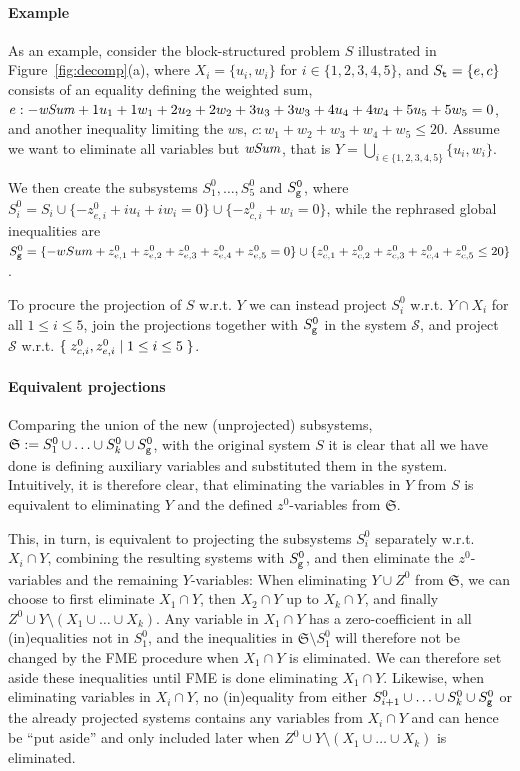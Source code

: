 \paragraph{Example}
As an example, consider the block-structured problem $S$ illustrated in Figure~\ref{fig:decomp}(a), where $X_i=\{u_i, w_i\}$ for $i\in\{1,2,3,4,5\}$, and $S_{\texttt{t}}=\{e,c\}$ consists of an equality defining the weighted sum, $e: - \mathit{wSum} + 1u_1+ 1w_1 + 2u_2+ 2w_2 + 3u_3+ 3w_3 + 4u_4+ 4w_4 + 5u_5+ 5w_5 = 0$, and another inequality limiting the $w$s, $c: w_1 + w_2 + w_3 + w_4 + w_5\leq 20$. Assume we want to eliminate all variables but $\mathit{wSum}$, that is $Y = \bigcup_{i\in\{1,2,3,4,5\}}\{u_i,w_i\}$.

We then create the subsystems $S^0_1, \ldots, S^0_5$ and $S^0_{\texttt{g}}$, where $S^0_i = S_i \cup 
\{-z^0_{e,i} + iu_i + iw_i = 0 \} \cup \{ -z^0_{c,i} + w_i = 0 \}$, while the rephrased global inequalities are $S_{\texttt{g}}^0 = \{-wSum + z^0_{e,1} + z^0_{e,2} + z^0_{e,3} + z^0_{e,4} + z^0_{e,5} = 0 \} \cup \{ z^0_{c,1} +z^0_{c,2} +z^0_{c,3}+z^0_{c,4}+z^0_{c,5} \leq 20\}$.   

To procure the projection of $S$ w.r.t. $Y$ we can instead project $S_i^0$ w.r.t. $Y\cap X_i$ for all $1\leq i\leq 5$, join the projections together with $S^0_{\texttt{g}}$ in the system $\mathcal{S}$, and project $\mathcal{S}$ w.r.t. $\{\;{z^0_{c,i}, z^0_{e,i}}\;|\;{1\leq i\leq 5}\;\}$. 

\paragraph{Equivalent projections}
Comparing the union of the new (unprojected) subsystems, $\mathfrak{S} := S_1^0\cup\ldots\cup S_k^0\cup S_{\texttt{g}}^0$, with the original system $S$ it is clear that
all we have done is defining auxiliary variables and substituted them in the system. Intuitively, it is therefore clear, that eliminating the variables in $Y$ from $S$ is equivalent to eliminating $Y$ and the defined $z^0$-variables from $\mathfrak{S}$. 

This, in turn, is equivalent to projecting the subsystems $S^0_i$ separately w.r.t. $X_i\cap Y$, combining the resulting systems with $S^0_{\texttt{g}}$, and then eliminate the $z^0$-variables and the remaining $Y$-variables: %
%
When eliminating $Y\cup Z^0$ from $\mathfrak{S}$, we can choose to first eliminate $X_1\cap Y$, then $X_2\cap Y$ up to $X_k\cap Y$, and finally $Z^0\cup Y\setminus(X_1\cup \ldots\cup X_k)$. 
Any variable in $X_1\cap Y$ has a zero-coefficient in all (in)equalities not in $S^0_1$, and the inequalities in $\mathfrak{S}\setminus S^0_1$ will therefore not be changed by the FME procedure when $X_1\cap Y$ is eliminated.  We can therefore set aside these inequalities until FME is done eliminating $X_1\cap Y$. Likewise, when eliminating variables in $X_i\cap Y$, no (in)equality from either $S_{i+1}^0\cup \ldots \cup S_k^0\cup S_{\texttt{g}}^0$ or the already projected systems contains any variables from $X_i\cap Y$ and can hence be ``put aside'' and only included later when $Z^0\cup Y\setminus(X_1\cup \ldots\cup X_k)$ is eliminated.

